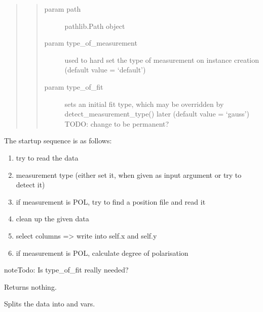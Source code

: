 \documentclass[letterpaper,10pt,english]{sphinxmanual}
\begin{document}
\begin{fulllineitems}
\begin{fulllineitems}
\begin{quote}
\begin{quote}
\begin{description}
\item[{param path}] \leavevmode
pathlib.Path object

\item[{param type\_of\_measurement}] \leavevmode
used to hard set the type of measurement
on instance creation (default value = ‘default’)

\item[{param type\_of\_fit}] \leavevmode
sets an initial fit type, which may be overridden
by detect\_measurement\_type() later (default value
= ‘gauss’)
TODO: change to be permanent?

\end{description}\end{quote}
\end{quote}

The startup sequence is as follows:
\begin{enumerate}
\def\theenumi{\arabic{enumi}}
\def\labelenumi{\theenumi .}
\makeatletter\def\p@enumii{\p@enumi \theenumi .}\makeatother
\item {} 
try to read the data

\item {} 
measurement type (either set it, when given as input argument or try to detect it)

\item {} 
if measurement is POL, try to find a position file and read it

\item {} 
clean up the given data

\item {} 
select columns =\textgreater{} write into self.x and self.y

\item {} 
if measurement is POL, calculate degree of polarisation

\end{enumerate}

\begin{sphinxadmonition}{note}{\label{measurement:index-1}Todo:}
Is type\_of\_fit really needed?
\end{sphinxadmonition}

Returns nothing.

\end{fulllineitems}


\begin{fulllineitems}
\label{\detokenize{measurement:measurement.Measurement.clean_data}}
Splits the  data into  and  vars.


\end{fulllineitems}
\end{fulllineitems}
\end{document}
